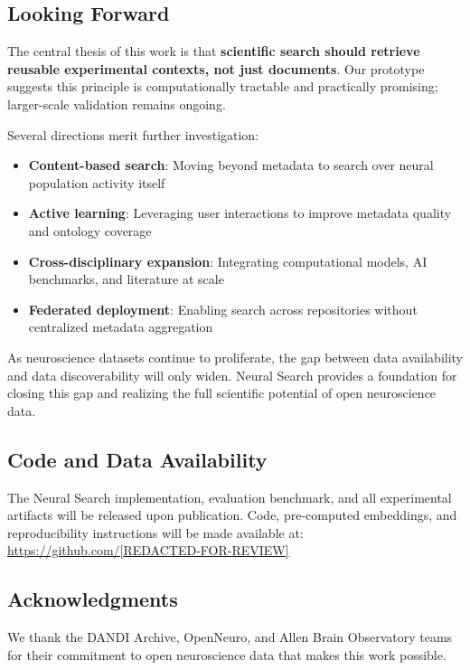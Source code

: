 \documentclass{article}
\theoremstyle{definition}
\begin{document}
\subsection{Looking Forward}

The central thesis of this work is that \textbf{scientific search should retrieve reusable experimental contexts, not just documents}. Our prototype suggests this principle is computationally tractable and practically promising; larger-scale validation remains ongoing.

Several directions merit further investigation:
\begin{itemize}
    \item \textbf{Content-based search}: Moving beyond metadata to search over neural population activity itself
    \item \textbf{Active learning}: Leveraging user interactions to improve metadata quality and ontology coverage
    \item \textbf{Cross-disciplinary expansion}: Integrating computational models, AI benchmarks, and literature at scale
    \item \textbf{Federated deployment}: Enabling search across repositories without centralized metadata aggregation
\end{itemize}

As neuroscience datasets continue to proliferate, the gap between data availability and data discoverability will only widen. Neural Search provides a foundation for closing this gap and realizing the full scientific potential of open neuroscience data.

\subsection*{Code and Data Availability}

The Neural Search implementation, evaluation benchmark, and all experimental artifacts will be released upon publication. Code, pre-computed embeddings, and reproducibility instructions will be made available at: \url{https://github.com/[REDACTED-FOR-REVIEW]}

\subsection*{Acknowledgments}

We thank the DANDI Archive, OpenNeuro, and Allen Brain Observatory teams for their commitment to open neuroscience data that makes this work possible.
\end{document}
